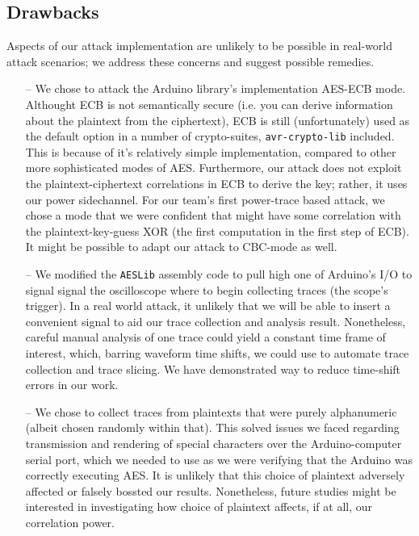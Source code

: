 \documentclass[journal]{ieee_style}
\begin{document}
\subsection{Drawbacks}
Aspects of our attack implementation are unlikely to be possible in real-world attack scenarios; we address these concerns and suggest possible remedies.
\begin{itemize}
    \item[--] We chose to attack the Arduino library's implementation AES-ECB mode. Althought ECB is not semantically secure (i.e. you can derive information about the plaintext from the ciphertext), ECB is still (unfortunately) used as the default option in a number of crypto-suites, \texttt{avr-crypto-lib} included. This is because of it's relatively simple implementation, compared to other more sophisticated modes of AES. Furthermore, our attack does not exploit the plaintext-ciphertext correlations in ECB to derive the key; rather, it uses our power sidechannel. For our team's first power-trace based attack, we chose a mode that we were confident that might have some correlation with the plaintext-key-guess XOR (the first computation in the first step of ECB). It might be possible to adapt our attack to CBC-mode as well.
    \item[--] We modified the \texttt{AESLib} assembly code to pull high one of Arduino's I/O to signal signal the oscilloscope where to begin collecting traces (the scope's trigger). In a real world attack, it unlikely that we will be able to insert a convenient signal to aid our trace collection and analysis result. Nonetheless, careful manual analysis of one trace could yield a constant time frame of interest, which, barring waveform time shifts, we could use to automate trace collection and trace slicing. We have demonstrated way to reduce time-shift errors in our work.
    \item[--] We chose to collect traces from plaintexts that were purely alphanumeric (albeit chosen randomly within that). This solved issues we faced regarding transmission and rendering of special characters over the Arduino-computer serial port, which we needed to use as we were verifying that the Arduino was correctly executing AES. It is unlikely that this choice of plaintext adversely affected or falsely bossted our results. Nonetheless, future studies might be interested in investigating how choice of plaintext affects, if at all, our correlation power.
\end{itemize}
\end{document}
